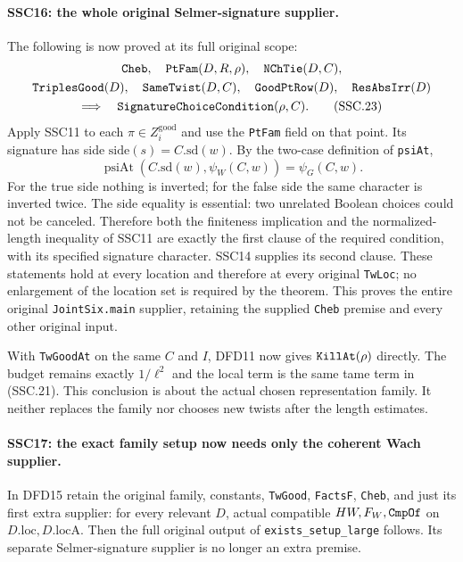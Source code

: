 \documentclass[11pt,a4paper]{article}
\numberwithin{equation}{section}
\theoremstyle{remark}\newtheorem{remark}[theorem]{Remark}
\begin{document}
\paragraph{SSC16: the whole original Selmer-signature supplier.}
\label{claim:SSC16}
The following is now proved at its full original scope:
\[
\begin{gathered}
 \texttt{Cheb},\quad \texttt{Pt\allowbreak Fam}(D,R,\rho),\quad
 \texttt{NCh\allowbreak Tie}(D,C),\\
 \texttt{Triples\allowbreak Good}(D),\quad\texttt{Same\allowbreak Twist}(D,C),\quad
 \texttt{Good\allowbreak Pt\allowbreak Row}(D),\quad\texttt{Res\allowbreak Abs\allowbreak Irr}(D)\\
 \Longrightarrow\quad
            \texttt{Signature\allowbreak Choice\allowbreak Condition}(\rho,C).        \tag{SSC.23}
\end{gathered}
\]
Apply SSC11 to each $\pi\in Z_i^{\mathrm{good}}$ and use the
\texttt{Pt\allowbreak Fam} field on that point. Its signature has side
$\mathrm{side}(s)=C.\mathrm{sd}(w)$. By the two-case definition
of \texttt{psi\allowbreak At},
\[
 \operatorname{psiAt}(C.\mathrm{sd}(w),\psi_W(C,w))
                        =\psi_G(C,w).                         \tag{SSC.24}
\]
For the true side nothing is inverted; for the false side the
same character is inverted twice. The side equality is essential:
two unrelated Boolean choices could not be canceled. Therefore
both the finiteness implication and the normalized-length
inequality of SSC11 are exactly the first clause of the required
condition, with its specified signature character. SSC14 supplies
its second clause. These statements hold at every location and
therefore at every original \texttt{Tw\allowbreak Loc}; no enlargement of the
location set is required by the theorem. This proves the entire
original \texttt{Joint\allowbreak Six.\allowbreak main} supplier, retaining the supplied
\texttt{Cheb} premise and every other original input.

With \texttt{Tw\allowbreak Good\allowbreak At} on the same $C$ and $I$, DFD11 now gives
$\texttt{Kill\allowbreak At}(\rho)$ directly. The budget remains exactly
$1/\ell^2$ and the local term is the same tame term in (SSC.21).
This conclusion is about the actual chosen representation family.
It neither replaces the family nor chooses new twists after
the length estimates.

\paragraph{SSC17: the exact family setup now needs only the coherent Wach supplier.}
\label{claim:SSC17}
In DFD15 retain the original family, constants, \texttt{Tw\allowbreak Good},
\texttt{Facts\allowbreak F}, \texttt{Cheb}, and just its first extra supplier:
for every relevant $D$, actual compatible
$HW,F_W,\texttt{Cmp\allowbreak Of}$ on $D.\mathrm{loc},D.\mathrm{locA}$.
Then the full original output of \texttt{exists\_\allowbreak setup\_\allowbreak large}
follows. Its separate Selmer-signature supplier is no longer an
extra premise.
\end{document}
